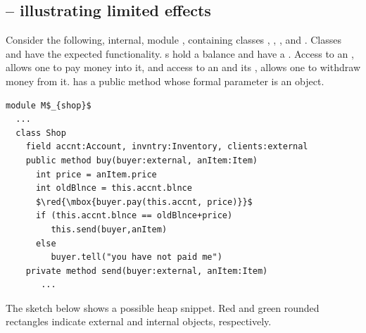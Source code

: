  

\subsection*{ -- illustrating limited effects}  
\label{sec:how}
\label{sec:shop}

Consider the following, internal, module \Mshop, %
containing classes , , , and . 
Classes  { and  have the expected functionality. 
s hold a balance and have a \password. 
Access to an ,  allows one  to pay money into it, 
and  access to an   and its , allows one to withdraw money from it.
}
   has  a public method  whose formal parameter  is an    object. 

\begin{lstlisting}[mathescape=true, language=Chainmail, frame=lines]
module M$_{shop}$
  ...   
  class Shop
    field accnt:Account, invntry:Inventory, clients:external      
    public method buy(buyer:external, anItem:Item)
      int price = anItem.price
      int oldBlnce = this.accnt.blnce
      $\red{\mbox{buyer.pay(this.accnt, price)}}$      
      if (this.accnt.blnce == oldBlnce+price)  
         this.send(buyer,anItem)
      else
         buyer.tell("you have not paid me")      
    private method send(buyer:external, anItem:Item)  
       ...         
\end{lstlisting}
 
 

The   sketch below  shows a possible heap snippet. Red and green rounded rectangles indicate external and internal objects, respectively. 

